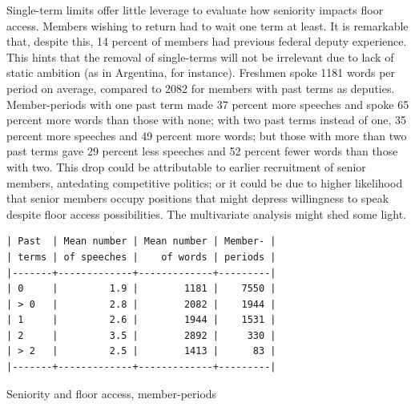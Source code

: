 \documentclass[letter,12pt]{article}
\begin{document}

Single-term limits offer little leverage to evaluate how seniority impacts floor access. Members wishing to return had to wait one term at least. It is remarkable that, despite this, 14 percent of members had previous federal deputy experience. This hints that the removal of single-terms will not be irrelevant due to lack of static ambition (as in Argentina, for instance). Freshmen spoke 1181 words per period on average, compared to 2082 for members with past terms as deputies. Member-periods with one past term made 37 percent more speeches and spoke 65 percent more words than those with none; with two past terms instead of one, 35 percent more speeches and 49 percent more words; but those with more than two past terms gave 29 percent less speeches and 52 percent fewer words than those with two. This drop could be attributable to earlier recruitment of senior members, antedating competitive politics; or it could be due to higher likelihood that senior members occupy positions that might depress willingness to speak despite floor access possibilities. The multivariate analysis might shed some light.  

\begin{table}
  \begin{scriptsize}
    \begin{verbatim}
| Past  | Mean number | Mean number | Member- |
| terms | of speeches |    of words | periods |
|-------+-------------+-------------+---------|
| 0     |         1.9 |        1181 |    7550 |
| > 0   |         2.8 |        2082 |    1944 |
| 1     |         2.6 |        1944 |    1531 |
| 2     |         3.5 |        2892 |     330 |
| > 2   |         2.5 |        1413 |      83 |
|-------+-------------+-------------+---------|
    \end{verbatim}
  \end{scriptsize}
\caption{Seniority and floor access, member-periods}
\end{table}
  
\end{document}
